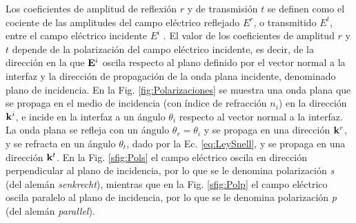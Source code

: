 Los coeficientes de amplitud de reflexión $r$ y de transmisión $t$ se definen como el cociente de las amplitudes del campo eléctrico reflejado $E^r$, o transmitido $E^t$, entre el campo eléctrico incidente $E^i$ . El valor de los coeficientes de amplitud $r$ y $t$ depende de la polarización del campo eléctrico incidente, es decir, de la dirección en la que $\vb{E}^i$ oscila respecto al plano definido por el vector normal a la interfaz y la dirección de propagación de la onda plana incidente, denominado plano de incidencia. En la Fig. \ref{fig:Polarizaciones} se muestra una onda plana que se propaga en el medio de incidencia (con índice de refracción $n_i$) en la dirección $\vb{k}^i$, e incide en la interfaz a un ángulo $\theta_i$ respecto al vector normal a la interfaz. La onda plana se refleja con un ángulo $\theta_r = \theta_i$ y se propaga en una dirección $\vb{k}^r$, y se refracta en un ángulo $\theta_t$, dado por la Ec. \eqref{eq:LeySnell}, y se propaga en una dirección $\vb{k}^t$. En la Fig. \ref{sfig:Pols} el campo eléctrico oscila en dirección perpendicular al plano de incidencia, por lo que se le denomina polarización \emph{s} (del alemán \emph{senkrecht}), mientras que en la Fig. \ref{sfig:Polp} el campo eléctrico oscila paralelo al plano de incidencia, por lo que se le denomina polarización \emph{p} (del alemán \emph{parallel}).
%
